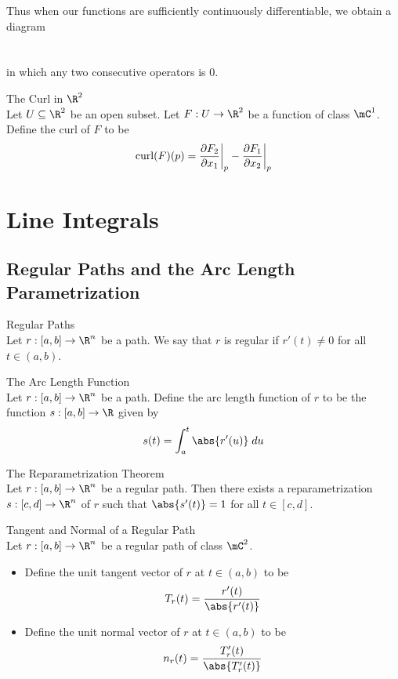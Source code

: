 \documentclass[a4paper]{article}
\begin{document}
Thus when our functions are sufficiently continuously differentiable, we obtain a diagram\\~\\
\\
in which any two consecutive operators is $0$. 

\begin{defn}{The Curl in $\R^2$}{}\\
Let $U\subseteq\R^2$ be an open subset. Let $F:U\to\R^2$ be a function of class $\mC^1$. Define the curl of $F$ to be $$\text{curl}(F)(p)=\frac{\partial F_2}{\partial x_1}\bigg{|}_p-\frac{\partial F_1}{\partial x_2}\bigg{|}_p$$
\end{defn}

\pagebreak
\section{Line Integrals}
\subsection{Regular Paths and the Arc Length Parametrization}
\begin{defn}{Regular Paths}{}\\
Let $r:[a,b]\to\R^n$ be a path. We say that $r$ is regular if $r'(t)\neq 0$ for all $t\in(a,b)$. 
\end{defn}

\begin{defn}{The Arc Length Function}{}\\
Let $r:[a,b]\to\R^n$ be a path. Define the arc length function of $r$ to be the function $s:[a,b]\to\R$ given by $$s(t)=\int_a^t\abs{r'(u)}\;du$$
\end{defn}

\begin{thm}{The Reparametrization Theorem}{}\\
Let $r:[a,b]\to\R^n$ be a regular path. Then there exists a reparametrization $s:[c,d]\to\R^n$ of $r$ such that $\abs{s'(t)}=1$ for all $t\in[c,d]$. 
\end{thm}

\begin{defn}{Tangent and Normal of a Regular Path}{}\\
Let $r:[a,b]\to\R^n$ be a regular path of class $\mC^2$. 
\begin{itemize}
\item Define the unit tangent vector of $r$ at $t\in(a,b)$ to be $$T_r(t)=\frac{r'(t)}{\abs{r'(t)}}$$
\item Define the unit normal vector of $r$ at $t\in(a,b)$ to be $$n_r(t)=\frac{T_r'(t)}{\abs{T_r'(t)}}$$
\end{itemize}
\end{defn}
\end{document}
